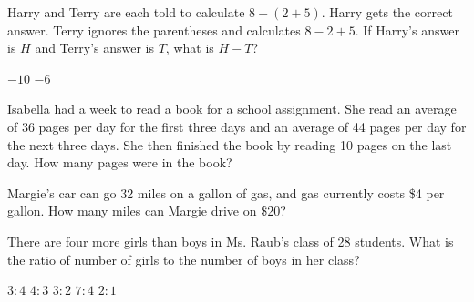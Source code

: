 \documentclass[12pt]{exam}
\begin{document}
\begin{center}

\end{center}
\vspace{24pt}
\noindent {}
\vspace{24pt}

\noindent {}

\begin{questions}
\question 
Harry and Terry are each told to calculate $8-(2+5)$. Harry gets the correct answer. Terry ignores the parentheses and calculates $8-2+5$. If Harry's answer is $H$ and Terry's answer is $T$, what is $H-T$?

\begin{oneparchoices}
\choice $-10$
\choice  $-6$
\end{oneparchoices}
\answerline

\question 
Isabella had a week to read a book for a school assignment. She read an average of 36 pages per day for the first three days and an average of 44 pages per day for the next three days. She then finished the book by reading 10 pages on the last day. How many pages were in the book?

\begin{oneparchoices}
\end{oneparchoices}
\answerline

\question 
Margie's car can go 32 miles on a gallon of gas, and gas currently costs \$4 per gallon. How many miles can Margie drive on \$20?

\begin{oneparchoices}
\end{oneparchoices}
\answerline

\question 
There are four more girls than boys in Ms. Raub's class of 28 students. What is the ratio of number of girls to the number of boys in her class?

\begin{oneparchoices}
\choice $3 \colon 4$	
\choice $4 \colon 3$
\choice $3 \colon 2$
\choice $7 \colon 4$
\choice $2 \colon 1$
\end{oneparchoices}
\answerline


\end{questions}
\end{document}
